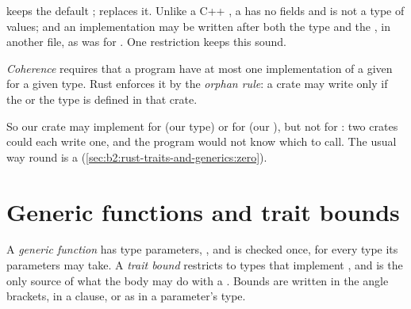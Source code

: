 \label{lst:b2:rust-traits-and-generics:lendable}

 keeps the default ;  replaces it. Unlike a C++ , a  has no fields
and is not a type of values; and an implementation may be written after both the type and the , in another
file, as  was for . One restriction keeps this sound.

\begin{definition}\label{def:b2:rust-traits-and-generics:coherence}
\emph{Coherence} requires that a program have at most one implementation of a given
 for a given type. Rust enforces it by the \emph{orphan rule}: a crate may write  only
if the  or the type is defined in that crate.
\end{definition}

So our crate may implement  for  (our type) or  for  (our ),
but not  for : two crates could each write one, and the program would not know which to
call. The usual way round is a \emph{} (\cref{sec:b2:rust-traits-and-generics:zero}).

\section{Generic functions and trait bounds}\label{sec:b2:rust-traits-and-generics:generics}

\begin{definition}\label{def:b2:rust-traits-and-generics:bound}
A \emph{generic function} has type parameters, , and is checked once,
for every type its parameters may take. A \emph{trait bound}  restricts  to
types that implement , and is the only source of what the body may do with a . Bounds are
written in the angle brackets, in a  clause, or as  in a parameter's type.
\end{definition}

